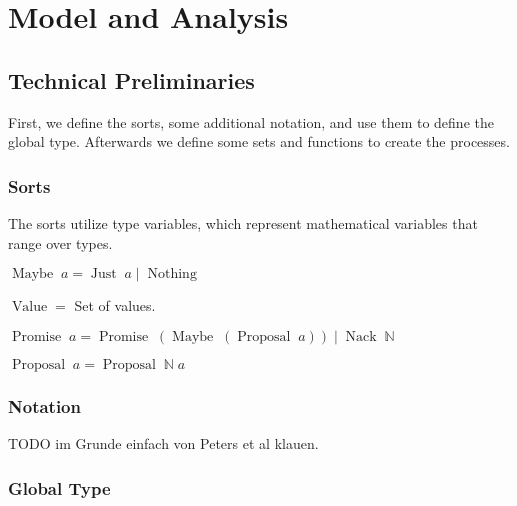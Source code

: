 \chapter{Model and Analysis}

\section{Technical Preliminaries}
First, we define the sorts, some additional notation, and use them to define the global type.
Afterwards we define some sets and functions to create the processes.

\subsection{Sorts}
The sorts utilize type variables, which represent mathematical variables that range over types.

\newcommand{\Maybe}[1]{\operatorname{Maybe}\; #1}
\newcommand{\Just}[1]{\operatorname{Just}\; #1}
\newcommand{\Nothing}[0]{\operatorname{Nothing}}
\newcommand{\Or}[0]{\; | \;}
\newcommand{\Promise}[1]{\operatorname{Promise}\; #1}
\newcommand{\Proposal}[1]{\operatorname{Proposal}\; #1}
\newcommand{\ProposalC}[2]{\operatorname{Proposal}\; #1\; #2}
\newcommand{\Nack}[1]{\operatorname{Nack}\; #1}
\newcommand{\Value}[0]{\operatorname{Value}}

$\Maybe{a} = \Just{a} \Or \Nothing$

$\Value =$ Set of values.

$\Promise{a} = \Promise{(\Maybe{(\Proposal{a})})} \Or \Nack{\mathbb{N}}$

$\Proposal{a} = \ProposalC{\mathbb{N}}{a}$

\subsection{Notation}
TODO im Grunde einfach von Peters et al klauen.

\subsection{Global Type}
\newcommand{\DotForall}[1]{\bigodot_{#1}\;}
\newcommand{\SendUnreliableG}[4]{#1 \to_u #2 : #3 \left\langle #4 \right\rangle}
\newcommand{\SendWeaklyG}[3]{#1 \to_w #2 : #3}

\newcommand{\Accept}[0]{\mathnormal{Accept}}
\newcommand{\Restart}[0]{\mathnormal{Restart}}
\newcommand{\Abort}[0]{\mathnormal{Abort}}

